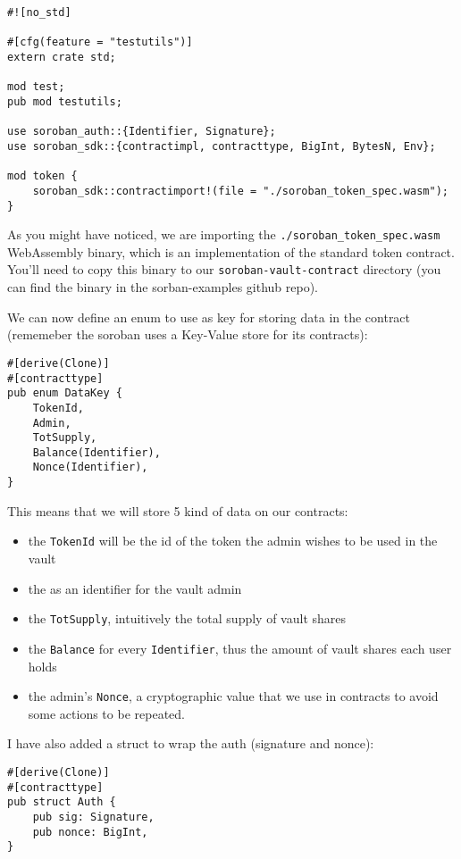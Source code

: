 \documentclass{article}
\newcommand{\inl}[1]{\lstinline{#1}}
\begin{document}
\begin{lstlisting}
#![no_std]

#[cfg(feature = "testutils")]
extern crate std;

mod test;
pub mod testutils;

use soroban_auth::{Identifier, Signature};
use soroban_sdk::{contractimpl, contracttype, BigInt, BytesN, Env};

mod token {
    soroban_sdk::contractimport!(file = "./soroban_token_spec.wasm");
}

\end{lstlisting}

As you might have noticed, we are importing the \inl{./soroban_token_spec.wasm} WebAssembly binary, which is an implementation of the standard token contract. You'll need to copy this binary to our \inl{soroban-vault-contract} directory (you can find the binary in the sorban-examples github repo).

We can now define an enum to use as key for storing data in the contract (rememeber the soroban uses a Key-Value store for its contracts):

\begin{lstlisting}
#[derive(Clone)]
#[contracttype]
pub enum DataKey {
    TokenId,
    Admin,
    TotSupply,
    Balance(Identifier),
    Nonce(Identifier),
}
\end{lstlisting}

This means that we will store 5 kind of data on our contracts:

\begin{itemize}
\item the \inl{TokenId} will be the id of the token the admin wishes to be used in the vault
\item the  as an identifier for the vault admin
\item the \inl{TotSupply}, intuitively the total supply of vault shares
\item the \inl{Balance} for every \inl{Identifier}, thus the amount of vault shares each user holds
\item the admin's \inl{Nonce}, a cryptographic value that we use in contracts to avoid some actions to be repeated.
\end{itemize}

I have also added a struct to wrap the auth (signature and nonce):

\begin{lstlisting}
#[derive(Clone)]
#[contracttype]
pub struct Auth {
    pub sig: Signature,
    pub nonce: BigInt,
}
\end{lstlisting}
\end{document}
